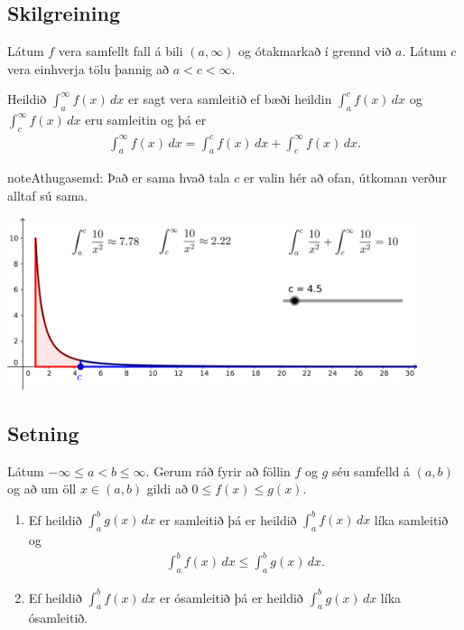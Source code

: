 \documentclass[a4paper,10pt,icelandic]{sphinxmanual}
\begin{document}
\subsection{Skilgreining}
\label{kafli06:id10}
Látum \(f\) vera samfellt fall á bili \((a,\infty)\) og
ótakmarkað í grennd við \(a\). Látum \(c\) vera einhverja tölu
þannig að \(a<c<\infty\).

Heildið \(\int_a^\infty f(x)\,dx\) er sagt vera samleitið ef bæði
heildin \(\int_a^c f(x)\,dx\) og \(\int_c^\infty f(x)\,dx\) eru
samleitin og þá er
\begin{equation*}
\begin{split}\int_{a}^\infty f(x)\,dx=\int_{a}^c f(x)\,dx + \int_c^\infty f(x)\,dx.\end{split}
\end{equation*}
\begin{notice}{note}{Athugasemd:}
Það er sama hvað tala \(c\) er valin hér að ofan, útkoman verður
alltaf sú sama.
\end{notice}


\begin{center}
\includegraphics[width=12cm,keepaspectratio=true]{07_samleitidheildi.png}
\end{center}



\subsection{Setning}
\label{kafli06:id11}
Látum \(-\infty\leq a<b\leq \infty\). Gerum ráð fyrir að föllin
\(f\) og \(g\) séu samfelld á \((a, b)\) og að um öll
\(x\in (a, b)\) gildi að \(0\leq f(x)\leq g(x)\).
\begin{enumerate}
\item {} 
Ef heildið \(\int_a^b g(x)\,dx\) er samleitið þá er heildið
\(\int_a^b f(x)\,dx\) líka samleitið og
\begin{equation*}
\begin{split}\int_a^b f(x)\,dx \leq \int_a^b g(x)\,dx.\end{split}
\end{equation*}
\item {} 
Ef heildið \(\int_a^b f(x)\,dx\) er ósamleitið þá er heildið
\(\int_a^b g(x)\,dx\) líka ósamleitið.

\end{enumerate}
\end{document}
